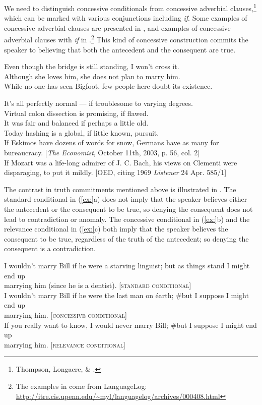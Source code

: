 We need to distinguish concessive conditionals from concessive adverbial clauses,\footnote{Thompson, Longacre, \& \citet{Hwang2007}.} which can be marked with various conjunctions including \textit{if}. Some examples of concessive adverbial clauses are presented in , and examples of concessive adverbial clauses with \textit{if} in .\footnote{The examples in  come from LanguageLog: \url{http://itre.cis.upenn.edu/~myl/languagelog/archives/000408.html}}  This kind of concessive construction commits the speaker to believing that both the antecedent and the consequent are true.


\ea
\ea Even though the bridge is still standing, I won’t cross it.\\
\ex Although she loves him, she does not plan to marry him.\\
\ex While no one has seen Bigfoot, few people here doubt its existence.
                       \z
\z

\ea
\ea It’s all perfectly normal — if troublesome to varying degrees.\\
\ex Virtual colon dissection is promising, if flawed.\\
\ex It was fair and balanced if perhaps a little old.\\
\ex Today hashing is a global, if little known, pursuit.\\
\ex If Eskimos have dozens of words for snow, Germans have as many for\\
  bureaucracy. [\textit{The Economist}, October 11th, 2003, p. 56, col. 2]\\
\ex If Mozart was a life-long admirer of J. C. Bach, his views on Clementi were\\
  disparaging, to put it mildly.  [OED, citing 1969 \textit{Listener} 24 Apr. 585/1]
                       \z
\z


The contrast in truth commitments mentioned above is illustrated in . The standard conditional in (\ref{ex:}a) does not imply that the speaker believes either the antecedent or the consequent to be true, so denying the consequent does not lead to contradiction or anomaly. The concessive conditional in (\ref{ex:}b) and the relevance conditional in (\ref{ex:}c) both imply that the speaker believes the consequent to be true, regardless of the truth of the antecedent; so denying the consequent is a contradiction.


\ea
\ea I wouldn’t marry Bill if he were a starving linguist; but as things stand I might end up\\
  marrying him (since he is a dentist).  [\textsc{standard} \textsc{conditional}]\\
\ex I wouldn’t marry Bill if he were the last man on éarth; \#but I suppose I might end up\\
  marrying him.  [\textsc{concessive conditional}]\\
\ex If you really want to know, I would never marry Bill; \#but I suppose I might end up\\
  marrying him.  [\textsc{relevance} \textsc{conditional}]
                       \z
\z


